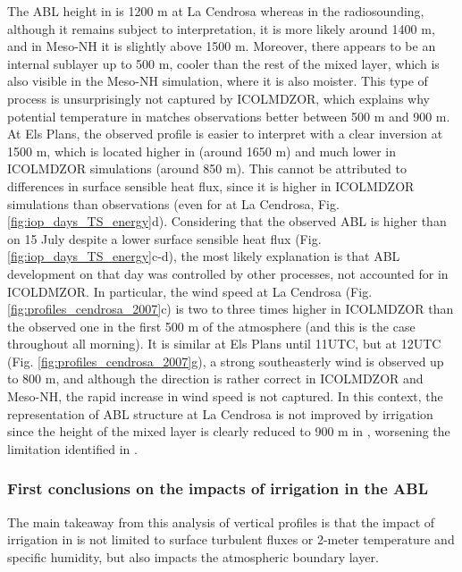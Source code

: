 The ABL height in \noirr is 1200 m at La Cendrosa whereas in the radiosounding, although it remains subject to interpretation, it is more likely around 1400 m, and in Meso-NH it is slightly above 1500 m.
Moreover, there appears to be an internal sublayer up to 500 m, cooler than the rest of the mixed layer, which is also visible in the Meso-NH simulation, where it is also moister. This type of process is unsurprisingly not captured by ICOLMDZOR, which explains why potential temperature in \irrboost matches observations better between 500 m and 900 m.
At Els Plans, the observed profile is easier to interpret with a clear inversion at 1500 m, which is located higher in \mesoexact (around 1650 m) and much lower in ICOLMDZOR simulations (around 850 m).
This cannot be attributed to differences in surface sensible heat flux, since it is higher in ICOLMDZOR simulations than observations (even for \irrboost at La Cendrosa, Fig. \ref{fig:iop_days_TS_energy}d).
Considering that the observed ABL is higher than on 15 July despite a lower surface sensible heat flux (Fig. \ref{fig:iop_days_TS_energy}c-d), the most likely explanation is that ABL development on that day was controlled by other processes, not accounted for in ICOLDMZOR.
In particular, the wind speed at La Cendrosa (Fig. \ref{fig:profiles_cendrosa_2007}c) is two to three times higher in ICOLMDZOR than the observed one in the first 500 m of the atmosphere (and this is the case throughout all morning). %
It is similar at Els Plans until 11UTC, but at 12UTC (Fig. \ref{fig:profiles_cendrosa_2007}g), a strong southeasterly wind is observed up to 800 m, and although the direction is rather correct in ICOLMDZOR and Meso-NH, the rapid increase in wind speed is not captured.
In this context, the representation of ABL structure at La Cendrosa is not improved by irrigation since the height of the mixed layer is clearly reduced to 900 m in \irrboost, worsening the limitation identified in \noirr.

\subsubsection*{First conclusions on the impacts of irrigation in the ABL}

The main takeaway from this analysis of vertical profiles is that the impact of irrigation in \irrboost is not limited to surface turbulent fluxes or 2-meter temperature and specific humidity, but also impacts the atmospheric boundary layer.


